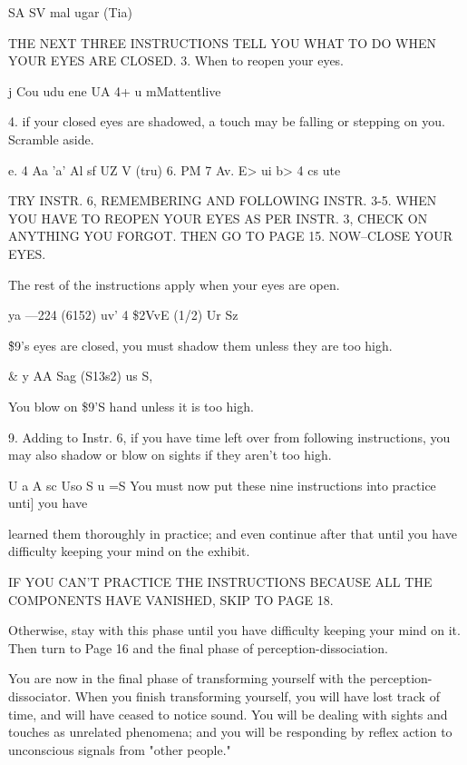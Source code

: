 \documentclass[10pt,twoside]{memoir}
\begin{document}
\begin{enumerate}
{\begin{enumerate}
\begin{sysrules}
\begin{sysrules}
\begin{sysrules}
\begin{sysrules}
{\begin{enumerate}
\begin{sysrules}
\begin{enumerate}
SA SV mal 
ugar (Tia) 


THE NEXT THREE INSTRUCTIONS TELL YOU WHAT TO DO 
WHEN YOUR EYES ARE CLOSED. 
3. When to reopen your eyes. 


j Cou 
udu ene UA 
4+ u mMattentlive 


4. if your closed eyes are shadowed, a touch may be falling or 
stepping on you. Scramble aside. 


e. 4 Aa 'a' Al sf 
UZ V (tru) 
6. PM 
7 Av. E> ui b> 
4 cs ute 


TRY INSTR. 6, REMEMBERING AND FOLLOWING INSTR. 3-5. 
WHEN YOU HAVE TO REOPEN YOUR EYES AS PER INSTR. 3, CHECK 
ON ANYTHING YOU FORGOT. THEN GO TO PAGE 15. NOW--CLOSE 
YOUR EYES. 


The rest of the instructions apply when your eyes are open. 


ya —224 (6152) uv' 
4 \$2VvE (1/2) Ur Sz 


\f \$9's eyes are closed, you must shadow them unless they are too high. 


& y AA Sag (S13s2) us S, 


You blow on \$9'S hand unless it is too high. 


9. Adding to Instr. 6, if you have time left over from following 
instructions, you may also shadow or blow on sights if they aren't too high. 


U a A sc Uso S 
u =S 
You must now put these nine instructions into practice unti] you have 


learned them thoroughly in practice; and even continue after that until you 
have difficulty keeping your mind on the exhibit. 


IF YOU CAN'T PRACTICE THE INSTRUCTIONS BECAUSE ALL 
THE COMPONENTS HAVE VANISHED, SKIP TO PAGE 18. 


Otherwise, stay with this phase until you have difficulty keeping your 
mind on it. Then turn to Page 16 and the final phase of 
perception-dissociation. 


You are now in the final phase of transforming yourself with the 
perception-dissociator. When you finish transforming yourself, you will have 
lost track of time, and will have ceased to notice sound. You will be dealing 
with sights and touches as unrelated phenomena; and you will be responding 
by reflex action to unconscious signals from "other people." 


\end{enumerate}
\end{sysrules}
\end{enumerate}}
\end{sysrules}
\end{sysrules}
\end{sysrules}
\end{sysrules}
\end{enumerate}}
\end{enumerate}
\end{document}
